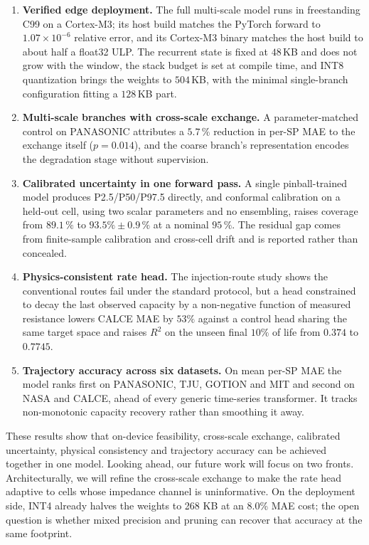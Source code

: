 \begin{enumerate}
\item \textbf{Verified edge deployment.} The full multi-scale model runs in
freestanding C99 on a Cortex-M3; its host build matches the PyTorch forward to
$1.07\times10^{-6}$ relative error, and its Cortex-M3 binary matches the host
build to about half a float32 ULP. The recurrent state is fixed at $48$\,KB and
does not grow with the window, the stack budget is set at compile time, and
INT8 quantization brings the weights to $504$\,KB, with the minimal
single-branch configuration fitting a $128$\,KB part.

\item \textbf{Multi-scale branches with cross-scale exchange.} A
parameter-matched control on PANASONIC attributes a $5.7\,\%$ reduction in
per-SP MAE to the exchange itself ($p=0.014$), and the coarse branch's
representation encodes the degradation stage without supervision.

\item \textbf{Calibrated uncertainty in one forward pass.} A single
pinball-trained model produces P2.5/P50/P97.5 directly, and conformal
calibration on a held-out cell, using two scalar parameters and no ensembling,
raises coverage from $89.1\,\%$ to $93.5\%\pm0.9\,\%$ at a nominal $95\,\%$.
The residual gap comes from finite-sample calibration and cross-cell drift and
is reported rather than concealed.

\item \textbf{Physics-consistent rate head.} The injection-route study shows
the conventional routes fail under the standard protocol, but a head
constrained to decay the last observed capacity by a non-negative function of
measured resistance lowers CALCE MAE by $53\%$ against a control head sharing
the same target space and raises $R^2$ on the unseen final $10\%$ of life from
$0.374$ to $0.7745$.

\item \textbf{Trajectory accuracy across six datasets.} On mean per-SP MAE the
model ranks first on PANASONIC, TJU, GOTION and MIT and second on NASA and
CALCE, ahead of every generic time-series transformer. It tracks non-monotonic capacity recovery rather than
smoothing it away.
\end{enumerate}

These results show that on-device feasibility, cross-scale exchange, calibrated
uncertainty, physical consistency and trajectory accuracy can be achieved
together in one model.
Looking ahead, our future work will focus on two fronts. Architecturally, we will
refine the cross-scale exchange to make the rate head adaptive to cells whose impedance
channel is uninformative. On the deployment side, INT4 already halves the weights
to 268 KB at an 8.0\% MAE cost; the open question is whether mixed precision and
pruning can recover that accuracy at the same footprint.
